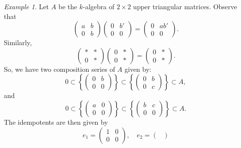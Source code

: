 \documentclass[a4paper]{report}
\theoremstyle{definition}
\theoremstyle{remark}
\theoremstyle{proposition}
\theoremstyle{conjecture}
\theoremstyle{lemma}
\theoremstyle{corollary}
\theoremstyle{exercise}
\theoremstyle{example}
\newtheorem{example}{Example}
\begin{document}
\begin{example}
    Let $A$ be the $k$-algebra of $2\times 2$ upper triangular matrices.
    Observe that $$\begin{pmatrix}
        a & b\\
        0 & b
        \end{pmatrix}\begin{pmatrix}
        0 & b'\\
        0& 0
        \end{pmatrix} = \begin{pmatrix}
        0 & ab'\\
        0 & 0
    \end{pmatrix}.$$
    Similarly,
    $$\begin{pmatrix}
        \ast & \ast\\
        0 & \ast
        \end{pmatrix} \begin{pmatrix}
        0&\ast \\
        0 & \ast
        \end{pmatrix} = \begin{pmatrix}
        0 &\ast\\
        0& \ast
    \end{pmatrix}.$$
    So, we have two composition series of $A$ given by:
    $$0 \subset \left\lbrace \begin{pmatrix}
            0 & b\\
            0 & 0
            \end{pmatrix}\right\rbrace \subset \left\lbrace \begin{pmatrix}
            0 & b\\
            0 & c
        \end{pmatrix}\right\rbrace \subset A,$$
        and
    $$0 \subset \left\lbrace \begin{pmatrix}
            a & 0\\
            0 & 0
            \end{pmatrix}\right\rbrace \subset \left\lbrace \begin{pmatrix}
            b & c\\
            0 & 0
        \end{pmatrix}\right\rbrace \subset A.$$
        The idempotents are then given by 
        $$e_1 = \begin{pmatrix}
            1 & 0\\
            0 & 0
            \end{pmatrix},\quad e_2 = \begin{pmatrix}

\end{pmatrix}$$
\end{example}
\end{document}
